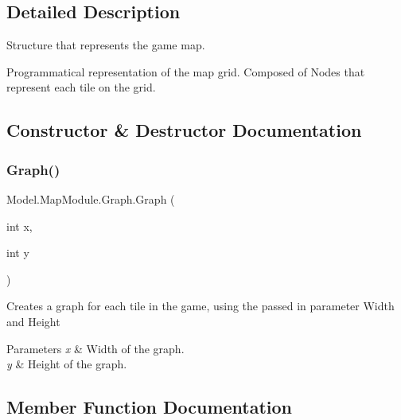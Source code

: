 \subsection{Detailed Description}
Structure that represents the game map. 

Programmatical representation of the map grid. Composed of Nodes that represent each tile on the grid. 

\subsection{Constructor \& Destructor Documentation}
\hypertarget{class_model_1_1_map_module_1_1_graph_a544b5d4f0e27b124634bb2e53de3ce66}{}\label{class_model_1_1_map_module_1_1_graph_a544b5d4f0e27b124634bb2e53de3ce66} 
\subsubsection{\texorpdfstring{Graph()}{Graph()}}
{\footnotesize\ttfamily Model.\+Map\+Module.\+Graph.\+Graph (\begin{DoxyParamCaption}\item[{int}]{x,  }\item[{int}]{y }\end{DoxyParamCaption})\hspace{0.3cm}{\ttfamily [inline]}}

Creates a graph for each tile in the game, using the passed in parameter Width and Height 
\begin{DoxyParams}{Parameters}
{\em x} & Width of the graph. \\
\hline
{\em y} & Height of the graph. \\
\hline
\end{DoxyParams}


\subsection{Member Function Documentation}
\hypertarget{class_model_1_1_map_module_1_1_graph_a49b627a9b9d37d7e5c2f0f456192ad4c}{}\label{class_model_1_1_map_module_1_1_graph_a49b627a9b9d37d7e5c2f0f456192ad4c} 

